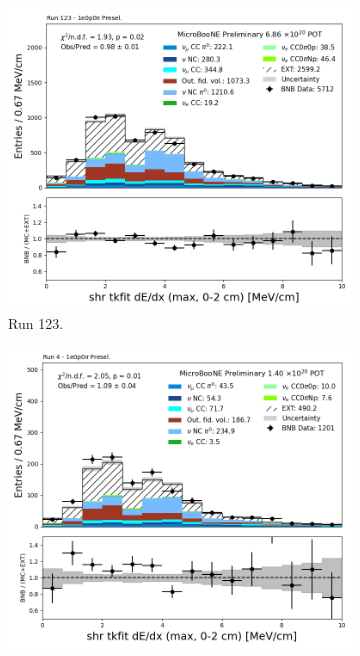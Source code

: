 \begin{figure}[H]
    \centering
    \begin{subfigure}[t]{0.32\linewidth}
        \includegraphics[width=\linewidth]{technote/Appendix_Preselection/Figures/1e0p0pi/Run123/shr_tkfit_2cm_dedx_max_Run123_1e0p0pi_Presel.png}
        \caption{Run 123.}
    \end{subfigure}%
    \hspace{0.2cm}%
    \begin{subfigure}[t]{0.32\linewidth}
        \includegraphics[width=\linewidth]{technote/Appendix_Preselection/Figures/1e0p0pi/Run4b/shr_tkfit_2cm_dedx_max_Run4b_1e0p0pi_Presel.png}

\end{subfigure}
\end{figure}
